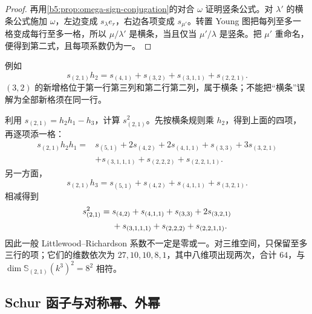 \begin{proof}
	再用\cref{b5:prop:omega-sign-conjugation}的对合 \(\omega\) 证明竖条公式。对 \(\lambda'\) 的横条公式施加 \(\omega\)，左边变成 \(s_\lambda e_r\)，右边各项变成 \(s_{\mu'}\)。转置 Young 图把每列至多一格变成每行至多一格，所以 \(\mu/\lambda'\) 是横条，当且仅当 \(\mu'/\lambda\) 是竖条。把 \(\mu'\) 重命名，便得到第二式，且每项系数仍为一。
\end{proof}

例如
\[
	s_{(2,1)}h_2=s_{(4,1)}+s_{(3,2)}+s_{(3,1,1)}+s_{(2,2,1)}.
\]
\((3,2)\) 的新增格位于第一行第三列和第二行第二列，属于横条；不能把“横条”误解为全部新格须在同一行。

\begin{example}\label{b5:exm:lr-square-21}
	利用 \(s_{(2,1)}=h_2h_1-h_3\)，计算 \(s_{(2,1)}^2\)。先按横条规则乘 \(h_2\)，得到上面的四项，再逐项添一格：
	\begin{align*}
		s_{(2,1)}h_2h_1 ={}&s_{(5,1)}+2s_{(4,2)}+2s_{(4,1,1)}+s_{(3,3)} +3s_{(3,2,1)}\\
		&+s_{(3,1,1,1)}+s_{(2,2,2)}+s_{(2,2,1,1)}.
	\end{align*}
	另一方面，
	\[
		s_{(2,1)}h_3 =s_{(5,1)}+s_{(4,2)}+s_{(4,1,1)}+s_{(3,2,1)}.
	\]
	相减得到
	\begin{align}
		s_{(2,1)}^2 ={}&s_{(4,2)}+s_{(4,1,1)}+s_{(3,3)}+2s_{(3,2,1)} \notag\\
		&+s_{(3,1,1,1)}+s_{(2,2,2)}+s_{(2,2,1,1)}.
		\label{b5:eq:lr-square-21}
	\end{align}
	因此一般 Littlewood--Richardson 系数不一定是零或一。对三维空间，只保留至多三行的项；它们的维数依次为 \(27,10,10,8,1\)，其中八维项出现两次，合计 \(64\)，与 \(\dim\mathbb S_{(2,1)}(k^3)^2=8^2\) 相符。
\end{example}

\subsection{Schur 函子与对称幂、外幂}
\label{b5:subsec:0704:03}

